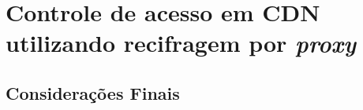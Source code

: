 \chapter{Controle de acesso em CDN utilizando recifragem por \emph{proxy}}





\section{Considerações Finais}
